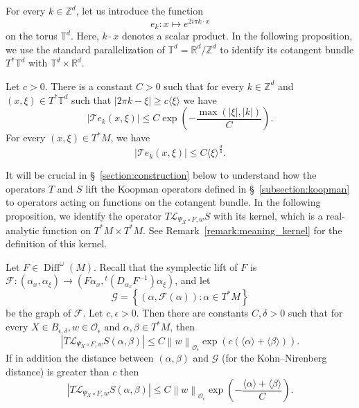 \documentclass[10pt]{amsart}
\theoremstyle{definition}\newtheorem{defi}[theo]{Definition}\newtheorem{rema}[theo]{Remark}\newtheorem{exam}[theo]{Example}\newtheorem{exem}[theo]{Example}\newtheorem{nota}[theo]{Notation}
\DeclareMathOperator{\Diff}{Diff}
\newcommand{\set}[1]{\left\{ #1 \right\}}
\newcommand{\p}[1]{\left(#1\right)}
\newcommand{\n}[1]{\left\|#1\right\|}
\newcommand{\va}[1]{\left|#1\right|}
\newcommand{\brac}[1]{\langle #1 \rangle}
\newcommand{\clO}{\mathcal{O}}
\newcommand{\clL}{\mathcal{L}}
\newcommand{\clF}{\mathcal{F}}
\newcommand{\clT}{\mathcal{T}}
\newcommand{\clG}{\mathcal{G}}
\newcommand{\bbZ}{\mathbb{Z}}
\newcommand{\bbT}{\mathbb{T}}
\newcommand{\bbR}{\mathbb{R}}
\begin{document}
For every $k \in \bbZ^d$, let us introduce the function
\begin{equation*}
e_k : x \mapsto e^{2 i \pi k \cdot x}
\end{equation*}
on the torus $\bbT^d$. Here, $k\cdot x$ denotes a scalar product. In the following proposition, we use the standard parallelization of $\bbT^d = \bbR^d / \bbZ^d$ to identify its cotangent bundle $T^* \bbT^d$ with $\bbT^d \times \bbR^d$.

\begin{prop}\label{proposition:localisation_torus}
Let $c > 0$. There is a constant $C > 0$ such that for every $k \in \bbZ^d$ and $(x,\xi) \in T^* \bbT^d$ such that $\va{2 \pi k - \xi} \geq c \brac{\xi}$ we have
\begin{equation}\label{eq:better_torus}
\va{\clT e_k(x,\xi)} \leq C \exp\p{- \frac{\max(\va{\xi},\va{k})}{C}}.
\end{equation}
For every $(x,\xi) \in T^* M$, we have
\begin{equation}\label{eq:straightforward_torus}
\va{\clT e_k(x,\xi)} \leq C \brac{\xi}^{\frac{d}{4}}.
\end{equation}
\end{prop}

It will be crucial in \S~\ref{section:construction} below to understand how the operators $T$ and $S$ lift the Koopman operators defined in \S~\ref{subsection:koopman} to operators acting on functions on the cotangent bundle. In the following proposition, we identify the operator $T \clL_{\Psi_X \circ F,w} S$ with its kernel, which is a real-analytic function on $T^* M \times T^* M$. See Remark~\ref{remark:meaning_kernel} for the definition of this kernel.

\begin{prop}\label{proposition:localisation_graph}
Let $F \in \Diff^\omega(M)$. Recall that the symplectic lift of $F$ is $\clF : (\alpha_x,\alpha_\xi) \to (F \alpha_x, {}^t (D_{\alpha_x} F^{-1}) \alpha_\xi)$, and let
\begin{equation*}
\clG = \set{ (\alpha,\clF(\alpha)): \alpha \in T^* M}
\end{equation*}
be the graph of $\clF$. Let $c,\epsilon > 0$. Then there are constants $C,\delta > 0$ such that for every $X \in B_{\epsilon,\delta}, w \in \clO_\epsilon$ and $\alpha,\beta \in T^* M$, then
\begin{equation}\label{eq:small_exponential_bound}
\va{T \clL_{\Psi_X \circ F,w} S(\alpha,\beta)} \leq C \n{w}_{\clO_\epsilon} \exp\p{c (\brac{\alpha} + \brac{\beta})}.
\end{equation}
If in addition the distance between $(\alpha,\beta)$ and $\clG$ (for the Kohn--Nirenberg distance) is greater than $c$ then
\begin{equation}\label{eq:exponential_decay_Koopman}
\va{T \clL_{\Psi_X \circ F,w} S(\alpha,\beta)} \leq C \n{w}_{\clO_\epsilon} \exp\p{ - \frac{\brac{\alpha} + \brac{\beta}}{C}}.
\end{equation}
\end{prop}
\end{document}
